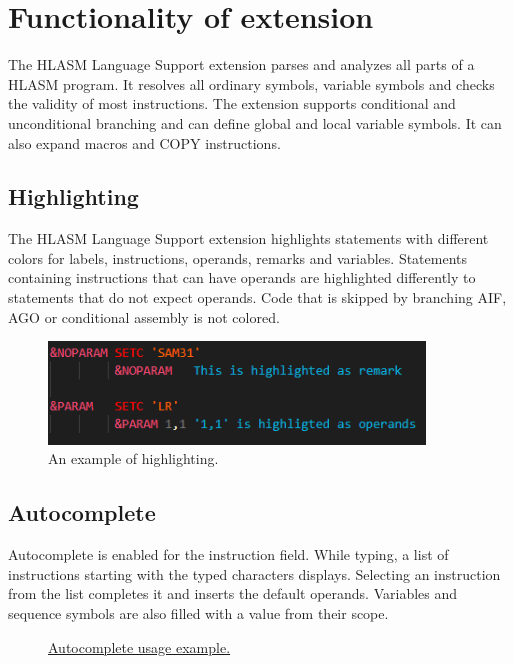 \section{Functionality of extension}
\label{sec:features}
The HLASM Language Support extension parses and analyzes all parts of a HLASM program. It resolves all ordinary symbols, variable symbols and checks the validity of most instructions. The extension supports conditional and unconditional branching and can define global and local variable symbols. It can also expand macros and COPY instructions.

\subsection{Highlighting}
The HLASM Language Support extension highlights statements with different colors for labels, instructions, operands, remarks and variables. Statements containing instructions that can have operands are highlighted differently to statements that do not expect operands. Code that is skipped by branching AIF, AGO or conditional assembly is not colored.

\begin{figure}[h]
	\centering
	\includegraphics[width=10cm]{img/highligting}
	\caption{An example of highlighting.}
\end{figure}

\subsection{Autocomplete}
Autocomplete is enabled for the instruction field. While typing, a list of instructions starting with the typed characters displays. Selecting an instruction from the list completes it and inserts the default operands. Variables and sequence symbols are also filled with a value from their scope.

\begin{figure}[H]
	\centering
	\caption{\href{https://github.com/eclipse/che-che4z-lsp-for-hlasm/blob/master/readme\_res/autocomplete.gif}{Autocomplete usage example.}}
\end{figure}

